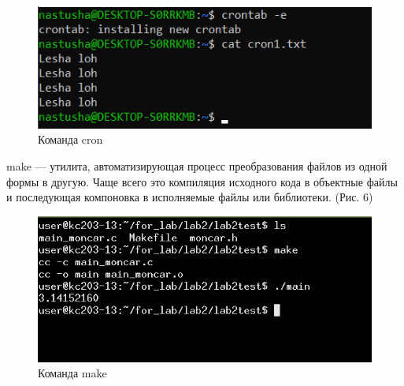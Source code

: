 \documentclass[a4paper,14pt]{extarticle}
\begin{document}
\begin{figure}[h!]
\centering
\includegraphics[width=1\linewidth]{cron.png}
\caption{Команда cron}
\label{fig:mpr}
\end{figure}

make — утилита, автоматизирующая процесс преобразования файлов из одной формы в другую. Чаще всего это компиляция исходного кода в объектные файлы и последующая компоновка в исполняемые файлы или библиотеки. (Рис. 6)

\begin{figure}[h!]
\centering
\includegraphics[width=1\linewidth]{make.png}
\caption{Команда make}
\label{fig:mpr}
\end{figure}


\end{document}
